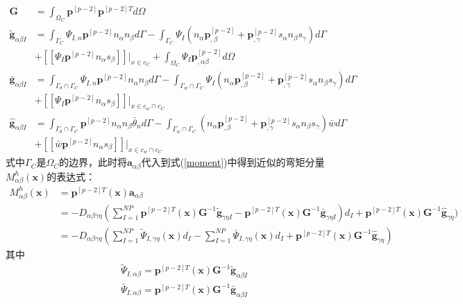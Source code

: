 \begin{align}
\label{PG}\pmb{G}&=\int_{\Omega_C}\pmb{p}^{[p-2]}\pmb{p}^{[p-2]T}d\Omega\\
\label{Pg1}\tilde{\pmb g}_{\alpha\beta I}&=\int_{\Gamma_C}\Psi_{I,n}\pmb{p}^{[p-2]}n_{\alpha}n_{\beta}d\Gamma-\int_{\Gamma_C}\Psi_I(n_{\alpha}\pmb{p}^{[p-2]}_{,\beta}+\pmb{p}^{[p-2]}_{,\gamma}s_{\alpha}n_{\beta}s_{\gamma})d\Gamma \nonumber\\
&+[[\Psi_I\pmb{p}^{[p-2]}n_{\alpha}s_{\beta}]]\vert_{x\in c_C}+\int_{\Omega_C}\Psi_I\pmb{p}^{[p-2]}_{,\alpha\beta}d\Omega\\
\label{Pg2}\bar{\pmb g}_{\alpha\beta I}&=\int_{{\Gamma_{\theta}}\cap{\Gamma_C}}\Psi_{I,n}\pmb{p}^{[p-2]}n_{\alpha}n_{\beta}d\Gamma-\int_{{\Gamma_w}\cap{\Gamma_C}}\Psi_I(n_{\alpha}\pmb{p}^{[p-2]}_{,\beta}+\pmb{p}^{[p-2]}_{,\gamma}s_{\alpha}n_{\beta}s_{\gamma})d\Gamma\nonumber\\
&+[[\Psi_I\pmb{p}^{[p-2]}n_{\alpha}s_{\beta}]]\vert_{x\in{c_w}\cap{c_C}}\\
\label{Pg3}\hat{\pmb g}_{\alpha\beta I}&=\int_{{\Gamma_{\theta}}\cap{\Gamma_C}}\pmb{p}^{[p-2]}n_{\alpha}n_{\beta}\bar{\theta}_nd\Gamma-\int_{{\Gamma_w}\cap{\Gamma_C}}(n_{\alpha}\pmb{p}^{[p-2]}_{,\beta}+\pmb{p}^{[p-2]}_{,\gamma}s_{\alpha}n_{\beta}s_{\gamma})\bar{w}d\Gamma\nonumber\\
&+[[\bar{w}\pmb{p}^{[p-2]}n_{\alpha}s_{\beta}]]\vert_{x\in{c_w}\cap{c_C}}
\end{align}
式中$\Gamma_C$是$\Omega_C$的边界，此时将$\pmb{a}_{\alpha\beta}$代入到式(\ref{moment})中得到近似的弯矩分量$M^h_{\alpha\beta}(\pmb{x})$的表达式：
\begin{equation}
\begin{split}
M^h_{\alpha\beta}(\pmb{x})&=\pmb{p}^{[p-2]T}(\pmb{x})\pmb a_{\alpha\beta}\\
&=-D_{\alpha\beta\gamma\eta}(\sum_{I=1}^{N\!P}\pmb{p}^{[p-2]T}(\pmb x)\pmb G^{-1}\tilde{\pmb g}_{\gamma\eta I}-\pmb{p}^{[p-2]T}(\pmb x)\pmb G^{-1}\bar{\pmb g}_{\gamma\eta I})d_I+\pmb{p}^{[p-2]T}(\pmb x)\pmb G^{-1}\hat{\pmb g}_{\gamma\eta})\\
&=-D_{\alpha\beta\gamma\eta}(\sum_{I=1}^{N\!P}\tilde{\Psi}_{I,\gamma\eta}(\pmb x)d_I-\sum_{I=1}^{N\!P}\bar{\Psi}_{I,\gamma\eta}(\pmb{x})d_I+\pmb{p}^{[p-2]T}(\pmb x)\pmb G^{-1}\hat{\pmb g}_{\gamma\eta})
\end{split}
\end{equation}
其中
\begin{align}
 \label{PTPSI}&\tilde{\Psi}_{I,\alpha\beta}=\pmb{p}^{[p-2]T}(\pmb x)\pmb G^{-1}\tilde{\pmb g}_{\alpha\beta I}\\
 \label{PBPSI}&\bar{\Psi}_{I,\alpha\beta}=\pmb{p}^{[p-2]T}(\pmb x)\pmb G^{-1}\bar{\pmb g}_{\alpha\beta I}
\end{align}\par
